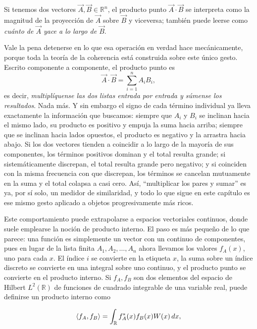 	Si tenemos dos vectores $\vec{A},\vec{B} \in \mathbb{R}^n$, el producto punto $\vec{A}\cdot\vec{B}$ se interpreta como la magnitud de la proyección de $\vec{A}$ sobre $\vec{B}$ y viceversa; también puede leerse como \textit{cuánto de $\vec{A}$ yace a lo largo de $\vec{B}$}.

	Vale la pena detenerse en lo que esa operación en verdad hace mecánicamente, porque toda la teoría de la coherencia está construida sobre este único gesto. Escrito componente a componente, el producto punto es
	\begin{equation}\label{eq:DotComponents}
		\vec{A}\cdot\vec{B} = \sum_{i=1}^{n} A_i B_i,
	\end{equation}
	es decir, \textit{multiplíquense las dos listas entrada por entrada y súmense los resultados}. Nada más. Y sin embargo el signo de cada término individual ya lleva exactamente la información que buscamos: siempre que $A_i$ y $B_i$ se inclinan hacia el mismo lado, su producto es positivo y empuja la suma hacia arriba; siempre que se inclinan hacia lados opuestos, el producto es negativo y la arrastra hacia abajo. Si los dos vectores tienden a coincidir a lo largo de la mayoría de sus componentes, los términos positivos dominan y el total resulta grande; si sistemáticamente discrepan, el total resulta grande pero negativo; y si coinciden con la misma frecuencia con que discrepan, los términos se cancelan mutuamente en la suma y el total colapsa a casi cero. Así, ``multiplicar los pares y sumar'' es ya, por sí solo, un medidor de similaridad, y todo lo que sigue en este capítulo es ese mismo gesto aplicado a objetos progresivamente más ricos.

	Este comportamiento puede extrapolarse a espacios vectoriales continuos, donde suele emplearse la noción de producto interno. El paso es más pequeño de lo que parece: una función es simplemente un vector con un continuo de componentes, pues en lugar de la lista finita $A_1,A_2,\dots,A_n$ ahora llevamos los valores $f_A(x)$, uno para cada $x$. El índice $i$ se convierte en la etiqueta $x$, la suma sobre un índice discreto se convierte en una integral sobre uno continuo, y el producto punto se convierte en el producto interno. Si $f_A , f_B$ son dos elementos del espacio de Hilbert $L^2(\mathbb{R})$ de funciones de cuadrado integrable de una variable real, puede definirse un producto interno como

	\begin{equation}\label{eq:ProdIn}
		\braket{f_A,f_B} = \int_\mathbb{R} f_A^*(x)f_B(x) W(x)\,dx,
	\end{equation}

